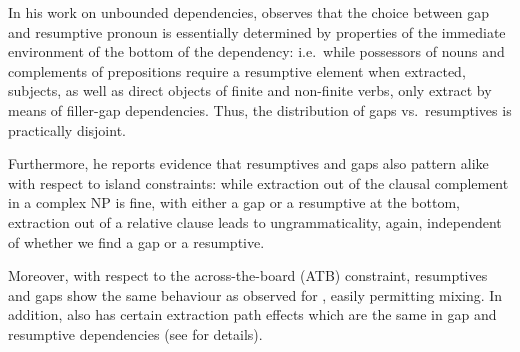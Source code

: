 \documentclass[output=paper
,notxmath 
 	        ,biblatex
                ,babelshorthands
                ,newtxmath
                ,draftmode
                ,colorlinks, citecolor=brown
]{langscibook}
\begin{document}
In his work on  unbounded dependencies,
\citet{Borsley.2010} observes that the choice between gap and
resumptive pronoun is essentially determined by properties of the
immediate environment of the bottom of the dependency: i.e.\ while
possessors of nouns and complements of prepositions require a
resumptive element when extracted, subjects, as well as direct objects
of finite and non-finite verbs, only extract by means of filler-gap
dependencies. Thus, the distribution of gaps vs.\ resumptives is
practically disjoint.

Furthermore, he reports evidence that resumptives and gaps also
pattern alike with respect to island constraints: while extraction out
of the clausal complement in a complex NP is fine, with either a gap
or a resumptive at the bottom, extraction out of a relative clause leads to
ungrammaticality, again, independent of whether we find a gap or a
resumptive.

\eal
{}
\zl

\noindent
Moreover, with respect to the across-the-board (ATB) constraint,
resumptives and gaps show the same behaviour as observed for ,
easily permitting mixing. In addition,  also has certain
extraction path effects which are the same in gap and resumptive
dependencies (see \citealp{Borsley.2010} for details).
\end{document}
